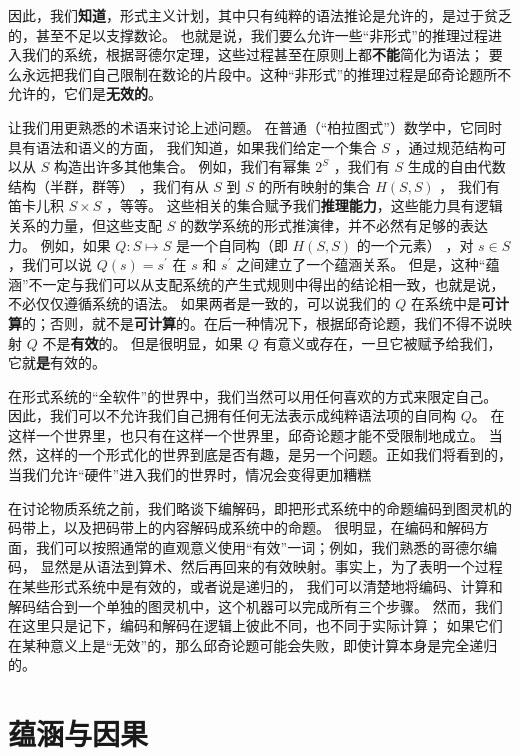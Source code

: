 \documentclass[a4paper,12pt]{article}
\begin{document}
因此，我们\textbf{知道}，形式主义计划，其中只有纯粹的语法推论是允许的，是过于贫乏的，甚至不足以支撑数论。
也就是说，我们要么允许一些“非形式”的推理过程进入我们的系统，根据哥德尔定理，这些过程甚至在原则上都\textbf{不能}简化为语法；
要么永远把我们自己限制在数论的片段中。这种“非形式”的推理过程是邱奇论题所不允许的，它们是\textbf{无效的}。

让我们用更熟悉的术语来讨论上述问题。 在普通（“柏拉图式”）数学中，它同时具有语法和语义的方面，
我们知道，如果我们给定一个集合 $S$ ，通过规范结构可以从 $S$ 构造出许多其他集合。
例如，我们有幂集 $2^S$ ，我们有 $S$ 生成的自由代数结构（半群，群等） ，我们有从 $S$ 到 $S$ 的所有映射的集合 $H(S, S)$ ，
我们有笛卡儿积 $S \times S$ ，等等。
这些相关的集合赋予我们\textbf{推理能力}，这些能力具有\gls{逻辑关系}的力量，但这些支配 $S$ 的数学系统的形式推演律，并不必然有足够的表达力。
例如，如果 $Q: S \mapsto S$ 是一个自同构（即 $H(S, S)$ 的一个元素） ，对 $s \in S $，我们可以说 $Q(s) = s^{\prime}$ 在 $s$ 和 $s^{\prime}$ 之间建立了一个蕴涵关系。
但是，这种“蕴涵”不一定与我们可以从支配系统的产生式规则中得出的结论相一致，也就是说，不必仅仅遵循系统的语法。
如果两者是一致的，可以说我们的 $Q$ 在系统中是\textbf{可计算}的；否则，就不是\textbf{可计算}的。在后一种情况下，根据邱奇论题，我们不得不说映射 $Q$ 不是\textbf{有效}的。
但是很明显，如果 $Q$ 有意义或存在，一旦它被赋予给我们，它就\textbf{是}有效的。

在形式系统的“全软件”的世界中，我们当然可以用任何喜欢的方式来限定自己。
因此，我们可以不允许我们自己拥有任何无法表示成纯粹语法项的自同构 $Q$。
在这样一个世界里，也只有在这样一个世界里，邱奇论题才能不受限制地成立。
当然，这样的一个形式化的世界到底是否有趣，是另一个问题。正如我们将看到的，当我们允许“硬件”进入我们的世界时，情况会变得更加糟糕

在讨论物质系统之前，我们略谈下编解码，即把形式系统中的命题编码到图灵机的码带上，以及把码带上的内容解码成系统中的命题。
很明显，在编码和解码方面，我们可以按照通常的直观意义使用“有效”一词；例如，我们熟悉的\gls{哥德尔编码}，
显然是从语法到算术、然后再回来的有效映射。事实上，为了表明一个过程在某些形式系统中是有效的，或者说是递归的，
我们可以清楚地将编码、计算和解码结合到一个单独的图灵机中，这个机器可以完成所有三个步骤。
然而，我们在这里只是记下，编码和解码在逻辑上彼此不同，也不同于实际计算；
如果它们在某种意义上是“无效”的，那么邱奇论题可能会失败，即使计算本身是完全递归的。

\section{蕴涵与因果}
\end{document}
